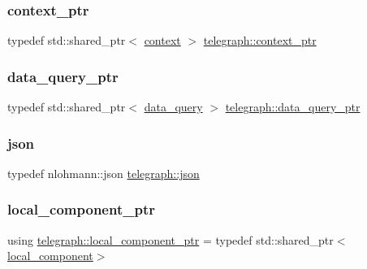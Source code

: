 \mbox{\label{namespacetelegraph_a332e681f0d44a1308cf3a013a9dd140f}} 
\subsubsection{\texorpdfstring{context\+\_\+ptr}{context\_ptr}}
{\footnotesize\ttfamily typedef std\+::shared\+\_\+ptr$<$ \hyperlink{classtelegraph_1_1context}{context} $>$ \hyperlink{namespacetelegraph_a332e681f0d44a1308cf3a013a9dd140f}{telegraph\+::context\+\_\+ptr}}

\mbox{\label{namespacetelegraph_a6ffe775ac48dca2a4013b53d692199c8}} 
\subsubsection{\texorpdfstring{data\+\_\+query\+\_\+ptr}{data\_query\_ptr}}
{\footnotesize\ttfamily typedef std\+::shared\+\_\+ptr$<$ \hyperlink{classtelegraph_1_1data__query}{data\+\_\+query} $>$ \hyperlink{namespacetelegraph_a6ffe775ac48dca2a4013b53d692199c8}{telegraph\+::data\+\_\+query\+\_\+ptr}}

\mbox{\label{namespacetelegraph_ab87b47a6b955c365ddd74c343ecc16f4}} 
\subsubsection{\texorpdfstring{json}{json}}
{\footnotesize\ttfamily typedef nlohmann\+::json \hyperlink{namespacetelegraph_ab87b47a6b955c365ddd74c343ecc16f4}{telegraph\+::json}}

\mbox{\label{namespacetelegraph_a69cfb42be07c9189123cfa3ff3ec4487}} 
\subsubsection{\texorpdfstring{local\+\_\+component\+\_\+ptr}{local\_component\_ptr}}
{\footnotesize\ttfamily using \hyperlink{namespacetelegraph_a69cfb42be07c9189123cfa3ff3ec4487}{telegraph\+::local\+\_\+component\+\_\+ptr} = typedef std\+::shared\+\_\+ptr$<$\hyperlink{classtelegraph_1_1local__component}{local\+\_\+component}$>$}

